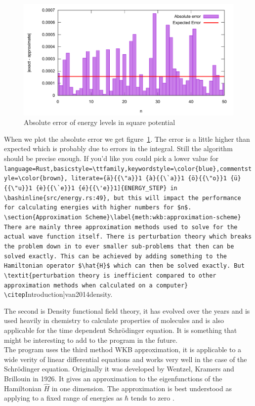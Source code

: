 \documentclass[11pt,DIV=10,final]{scrreprt} %
\providecommand{\rustinline}{\lstinline[language=Rust,basicstyle=\ttfamily,keywordstyle=\color{blue},commentstyle=\color{brown}, literate={ä}{{\"a}}1 {à}{{\`a}}1 {ö}{{\"o}}1 {ü}{{\"u}}1 {è}{{\`e}}1 {é}{{\'e}}1]} % für Inline-C++ Code
\providecommand{\bashinline}{\lstinline[language=bash,basicstyle=\ttfamily,keywordstyle=\color{blue},commentstyle=\color{brown}, literate={ä}{{\"a}}1 {à}{{\`a}}1 {ö}{{\"o}}1 {ü}{{\"u}}1 {è}{{\`e}}1 {é}{{\'e}}1]} % für Inline-C++ Code
\begin{document}
\begin{figure}[H]\label{fig:energy-error}
  \centering
  \includegraphics[width=\textwidth]{plots/energy_error.pdf}
  \caption{Absolute error of energy levels in square potential}
\end{figure}
When we plot the absolute error we get figure~\ref{fig:energy-error}. The error is a little higher than expected which is probably due to errors in the integral. Still the algorithm should be precise
enough. If you'd like you could pick a lower value for \rustinline{ENERGY_STEP} in \bashinline{src/energy.rs:49}, but this will impact the performance for calculating energies with higher numbers for $n$.


\section{Approximation Scheme}\label{meth:wkb:approximation-scheme}
There are mainly three approximation methods used to solve for the actual wave function itself. There is perturbation theory which breaks the problem down in to ever smaller sub-problems that then can be
solved exactly. This can be achieved by adding something to the Hamiltonian operator $\hat{H}$ which can then be solved exactly. But \textit{perturbation theory is inefficient compared to other approximation
methods when calculated on a computer} \citep[Introduction]{van2014density}.

The second is Density functional field theory, it has evolved over the years and is used heavily in chemistry to calculate properties of molecules and is also applicable for the time dependent Schrödinger
equation. It is something that might be interesting to add to the program in the future.
\\

The program uses the third method WKB approximation, it is applicable to a wide verity of linear differential equations and works very well in the case of the Schrödinger equation.
Originally it was developed by Wentzel, Kramers and Brillouin in 1926. It gives an approximation to the eigenfunctions of the Hamiltonian $\hat{H}$ in one dimension. The approximation is best
understood as applying to a fixed range of energies as $\hbar$ tends to zero \citep[p.~305]{hall2013quantum}.
\\
\end{document}
